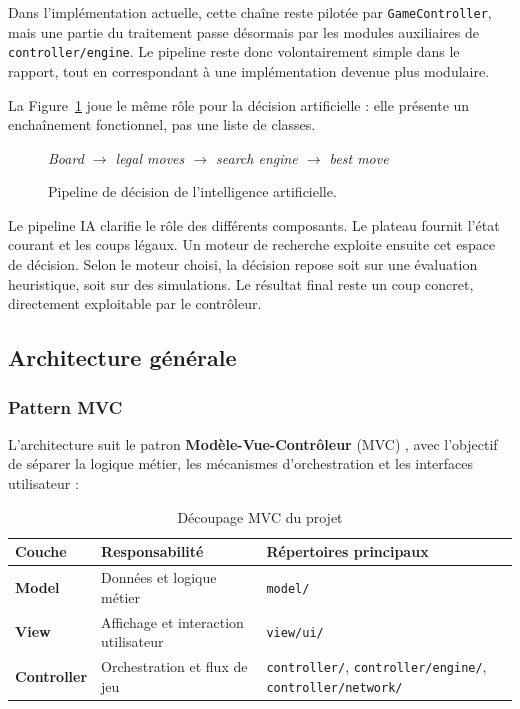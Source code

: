 \documentclass[a4paper]{article}
\providecommand{\toprule}{\hline}
\providecommand{\midrule}{\hline}
\providecommand{\bottomrule}{\hline}
\begin{document}
Dans l'implémentation actuelle, cette chaîne reste pilotée par \texttt{GameController}, mais une partie du traitement passe désormais par les modules auxiliaires de \texttt{controller/engine}. Le pipeline reste donc volontairement simple dans le rapport, tout en correspondant à une implémentation devenue plus modulaire.

La Figure~\ref{fig:ai-pipeline} joue le même rôle pour la décision artificielle : elle présente un enchaînement fonctionnel, pas une liste de classes.

\begin{figure}[H]
\centering
{\small\itshape
Board $\rightarrow$ legal moves $\rightarrow$ search engine $\rightarrow$ best move\par
}
\caption{Pipeline de décision de l'intelligence artificielle.}
\label{fig:ai-pipeline}
\end{figure}

Le pipeline IA clarifie le rôle des différents composants. Le plateau fournit l'état courant et les coups légaux. Un moteur de recherche exploite ensuite cet espace de décision. Selon le moteur choisi, la décision repose soit sur une évaluation heuristique, soit sur des simulations. Le résultat final reste un coup concret, directement exploitable par le contrôleur.

\subsection{Architecture générale}

\subsubsection{Pattern MVC}

L'architecture suit le patron \textbf{Modèle-Vue-Contrôleur} (MVC) \cite{gamma1994}, avec l'objectif de séparer la logique métier, les mécanismes d'orchestration et les interfaces utilisateur :

\begin{table}[H]
\centering
\begin{tabular}{lll}
\toprule
\textbf{Couche} & \textbf{Responsabilité} & \textbf{Répertoires principaux} \\
\midrule
\textbf{Model} & Données et logique métier & \texttt{model/} \\
\textbf{View} & Affichage et interaction utilisateur & \texttt{view/ui/} \\
\textbf{Controller} & Orchestration et flux de jeu & \texttt{controller/}, \texttt{controller/engine/}, \texttt{controller/network/} \\
\bottomrule
\end{tabular}
\caption{Découpage MVC du projet}
\end{table}
\end{document}
